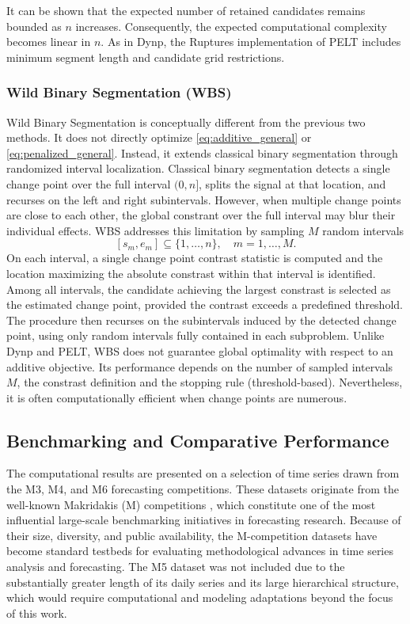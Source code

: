 \documentclass[preprints,article,submit,pdftex,moreauthors]{Definitions/mdpi}
\begin{document}
It can be shown that the expected number of retained candidates remains bounded as $n$ increases. Consequently, the expected computational complexity becomes linear in $n$. 
As in Dynp, the Ruptures implementation of PELT includes minimum segment length and candidate grid restrictions.

\subsubsection{Wild Binary Segmentation (WBS)}
Wild Binary Segmentation \cite{F14} is conceptually different from the previous two methods. It does not directly optimize \eqref{eq:additive_general} or \eqref{eq:penalized_general}. Instead, it extends classical binary segmentation through randomized interval localization. 
Classical binary segmentation detects a single change point over the full interval $(0,n]$, splits the signal at that location, and recurses on the left and right subintervals. However, when multiple change points are close to each other, the global constrant over the full interval may blur their individual effects. 
WBS addresses this limitation by sampling $M$ random intervals \[
[s_m,e_m] \subseteq \{1,\dots,n\},
\quad m=1,\dots,M.
\]
On each interval, a single change point contrast statistic is computed and the location maximizing the absolute constrast within that interval is identified. Among all intervals, the candidate achieving the largest constrast is selected as the estimated change point, provided the contrast exceeds a predefined threshold. 
The procedure then recurses on the subintervals induced by the detected change point, using only random intervals fully contained in each subproblem. 
Unlike Dynp and PELT, WBS does not guarantee global optimality with respect to an additive objective. Its performance depends on the number of sampled intervals $M$, the constrast definition and the stopping rule (threshold-based). Nevertheless, it is often computationally efficient when change points are numerous. 

\subsection{Benchmarking and Comparative Performance} \label{subsec:benchmarking}

The computational results are presented on a selection of time series drawn from the M3, M4, and M6 forecasting competitions. These datasets originate from the well-known Makridakis (M) competitions \cite{MH79}, which constitute one of the most influential large-scale benchmarking initiatives in forecasting research. Because of their size, diversity, and public availability, the M-competition datasets have become standard testbeds for evaluating methodological advances in time series analysis and forecasting. The M5 dataset was not included due to the substantially greater length of its daily series and its large hierarchical structure, which would require computational and modeling adaptations beyond the focus of this work.
\end{document}
